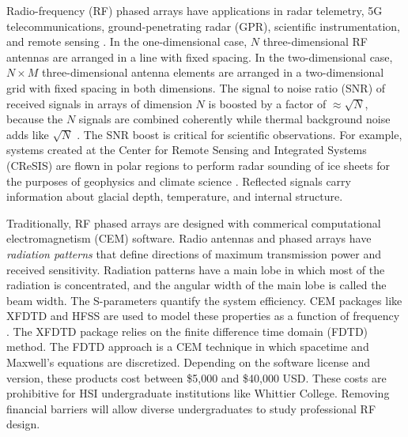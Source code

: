 \documentclass[../../main.tex]{subfiles}
\begin{document}
\label{sec:top}

Radio-frequency (RF) phased arrays have applications in radar telemetry, 5G telecommunications, ground-penetrating radar (GPR), scientific instrumentation, and remote sensing \cite{Vieregg_2016,AVVA201746,arnold_2020,PhysRevD.105.122006,10.3390/s21186091,10.1016/j.jappgeo.2022.104876,phased_array_book}.  In the one-dimensional case, $N$ three-dimensional RF antennas are arranged in a line with fixed spacing.  In the two-dimensional case, $N \times M$ three-dimensional antenna elements are arranged in a two-dimensional grid with fixed spacing in both dimensions.  The signal to noise ratio (SNR) of received signals in arrays of dimension $N$ is boosted by a factor of $\approx \sqrt{N}$, because the $N$ signals are combined coherently while thermal background noise adds like $\sqrt{N}$ \cite{AVVA201746}.  The SNR boost is critical for scientific observations.  For example, systems created at the Center for Remote Sensing and Integrated Systems (CReSIS) are flown in polar regions to perform radar sounding of ice sheets for the purposes of geophysics and climate science \cite{arnold_2020}.  Reflected signals carry information about glacial depth, temperature, and internal structure.  \\ \vspace{2.5mm}

Traditionally, RF phased arrays are designed with commerical computational electromagnetism (CEM) software.  Radio antennas and phased arrays have \textit{radiation patterns} that define directions of maximum transmission power and received sensitivity.  Radiation patterns have a main lobe in which most of the radiation is concentrated, and the angular width of the main lobe is called the beam width.  The S-parameters quantify the system efficiency.  CEM packages like XFDTD and HFSS are used to model these properties as a function of frequency \cite{remcom,ansys}.  The XFDTD package relies on the finite difference time domain (FDTD) method. The FDTD approach is a CEM technique in which spacetime and Maxwell’s equations are discretized.  Depending on the software license and version, these products cost between \$5,000 and \$40,000 USD.  These costs are prohibitive for HSI undergraduate institutions like Whittier College.  Removing financial barriers will allow diverse undergraduates to study professional RF design. \\ \vspace{2.5mm}
\end{document}

